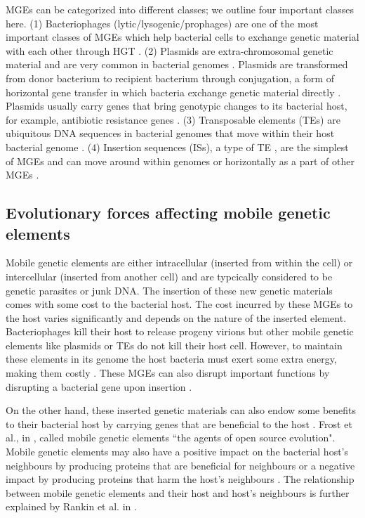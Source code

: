 MGEs can be categorized into different classes; we outline four important classes here. 
(1) Bacteriophages (lytic/lysogenic/prophages) are one of the most important classes of MGEs which help bacterial cells to exchange genetic material with each other through HGT \cite{ canchaya_phage_2003}. (2) Plasmids are extra-chromosomal genetic material and are very common in bacterial genomes \cite{ phillips_plasmid_2004}. Plasmids are transformed from donor bacterium to recipient bacterium through conjugation, a form of horizontal gene transfer in which bacteria exchange genetic material directly \cite{ phillips_plasmid_2004}.  Plasmids usually carry genes that bring genotypic changes to its bacterial host, for example, antibiotic resistance genes \cite{ svara_evolution_2011}.   
(3) Transposable elements (TEs) are ubiquitous DNA sequences in bacterial genomes that move within their host bacterial genome \cite{ garrido-ramos_evolutionary_2012}. 
(4) Insertion sequences (ISs), a type of TE \cite{capy_dynamics_1998}, are the simplest of MGEs and can move around within genomes or horizontally as a part of other MGEs \cite{ vandecraen_impact_2017}.

 \subsection{Evolutionary forces affecting mobile genetic elements}
 
 Mobile genetic elements are either intracellular (inserted from within the cell) or intercellular (inserted from another cell) and are typcically considered to be genetic parasites or junk DNA. The insertion of these new genetic materials comes with some cost to the bacterial host. The cost incurred by these MGEs to the host varies significantly and depends on the nature of the inserted element. Bacteriophages kill their host to release progeny virions but other mobile genetic elements like plasmids or TEs do not kill their host cell. However, to maintain these elements in its genome the host bacteria must exert some extra energy, making them costly \cite{diaz_ricci_plasmid_2000}.  These MGEs can also disrupt important functions by disrupting a bacterial gene upon insertion \cite{simser_novel_2005, naito_role_2016}.

On the other hand, these inserted genetic materials can also endow some benefits to their bacterial host by carrying genes that are beneficial to the host \cite{vandecraen_impact_2017}. Frost et al., in \cite{frost_mobile_2005}, called mobile genetic elements  ``the agents of open source evolution". 
Mobile genetic elements may also have a positive impact on the bacterial host’s neighbours by producing proteins that are beneficial for neighbours \cite{livermore_beta-lactamases_1995} or a negative impact by producing proteins that harm the host’s neighbours \cite{dykes_selection_1997}.  The relationship between mobile genetic elements and their host and host’s neighbours is further explained by  Rankin et al. in \cite{rankin_what_2011}.
 
